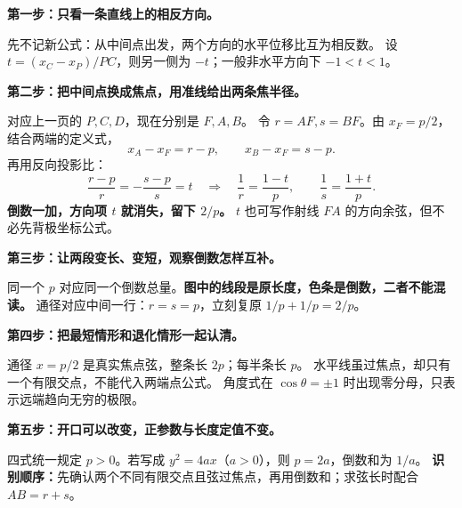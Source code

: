 \clearpage
\begin{explanationbox}
\textbf{第一步：只看一条直线上的相反方向。}
\begin{center}\end{center}

先不记新公式：从中间点出发，两个方向的水平位移比互为相反数。
设 $t=(x_C-x_P)/PC$，则另一侧为 $-t$；一般非水平方向下 $-1<t<1$。
\end{explanationbox}
\clearpage
\begin{explanationbox}
\textbf{第二步：把中间点换成焦点，用准线给出两条焦半径。}
\begin{center}\end{center}

对应上一页的 $P,C,D$，现在分别是 $F,A,B$。
令 $r=AF,s=BF$。由 $x_F=p/2$，结合两端的定义式，
\[
 x_A-x_F=r-p,\qquad x_B-x_F=s-p.
\]
再用反向投影比：
\[
 \frac{r-p}{r}=-\frac{s-p}{s}=t
 \quad\Longrightarrow\quad
 \frac1r=\frac{1-t}{p},\qquad\frac1s=\frac{1+t}{p}.
\]
\textbf{倒数一加，方向项 $t$ 就消失，留下 $2/p$。}
$t$ 也可写作射线 $FA$ 的方向余弦，但不必先背极坐标公式。
\end{explanationbox}
\clearpage
\begin{explanationbox}
\textbf{第三步：让两段变长、变短，观察倒数怎样互补。}
\begin{center}\end{center}

同一个 $p$ 对应同一个倒数总量。\textbf{图中的线段是原长度，色条是倒数，二者不能混读。}
通径对应中间一行：$r=s=p$，立刻复原 $1/p+1/p=2/p$。
\end{explanationbox}
\clearpage
\begin{explanationbox}
\textbf{第四步：把最短情形和退化情形一起认清。}
\begin{center}\end{center}

通径 $x=p/2$ 是真实焦点弦，整条长 $2p$；每半条长 $p$。
水平线虽过焦点，却只有一个有限交点，不能代入两端点公式。
角度式在 $\cos\theta=\pm1$ 时出现零分母，只表示远端趋向无穷的极限。
\end{explanationbox}
\clearpage
\begin{explanationbox}
\textbf{第五步：开口可以改变，正参数与长度定值不变。}
\begin{center}\end{center}

四式统一规定 $p>0$。若写成 $y^2=4ax$（$a>0$），则 $p=2a$，倒数和为 $1/a$。
\textbf{识别顺序：}先确认两个不同有限交点且弦过焦点，再用倒数和；求弦长时配合 $AB=r+s$。
\end{explanationbox}
